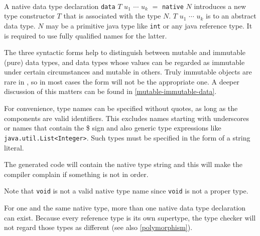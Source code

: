 \begin{flushleft}
    \sym{=}   
\alt {}   \sym{=}   
\alt {}   \sym{=}   \\
 
  \alt {}
  \alt {}  
  \alt {}  
\end{flushleft}

A native data type declaration \texttt{data} $T$ $u_1$ $\cdots$ $u_k$ $=$ \texttt{native} $N$ introduces a new type constructor $T$ that is associated with the \java{} type $N$. $T$  $u_1$ $\cdots$ $u_k$ is to \frege{} an abstract data type. $N$ may be a primitive java type like \texttt{int} or any java reference type. It is required to use fully qualified \java{} names for the latter.

The three syntactic forms help to distinguish between mutable and immutable (pure) data types, 
and data types whose values can be regarded as immutable under certain circumstances and mutable in others. 
Truly immutable objects are rare in \java{}, so in most cases the  form will not be the appropriate one. A deeper discussion of this matters can be found in \autoref{mutable-immutable-data}.

For convenience, \java{} type names can be specified without quotes, as long as the components are valid \frege{} identifiers. This excludes names starting with underscores or names that contain the \$ sign and also \java{} generic type expressions like \texttt{java.util.List<Integer>}. Such \java{} types must be specified in the form of a string literal.

The generated code will contain the native type string and this will make the \java{} compiler complain if something is not in order.

Note that \texttt{void} is not a valid native type name since \texttt{void} is not a proper type.

For one and the same native type, more than one native data type declaration can exist. Because every reference type is its own supertype, the type checker will not regard those types as different (see also \autoref{polymorphism}).


